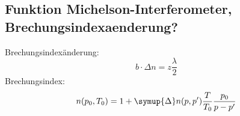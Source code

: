 \subsection{Funktion Michelson-Interferometer, Brechungsindexaenderung?}
Brechungsindexänderung:
    \begin{equation}
        \label{eqn:brechungsindexunterschied}
        b \cdot \Delta n = z \frac{\lambda}{2}    
    \end{equation}
Brechungsindex:
    \begin{equation}
        \label{eqn:brechungsindex}
        n(p_0,T_0) = 1 + \symup{\Delta}n(p,p') \frac{T}{T_0} \frac{p_0}{p - p'}
    \end{equation}
        